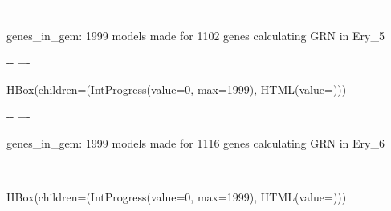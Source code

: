 \documentclass[letterpaper,10pt,english]{sphinxmanual}
\newlength\nbsphinxcodecellspacing
\begin{document}
%
{
\kern-\sphinxverbatimsmallskipamount\kern-\baselineskip
\kern+\FrameHeightAdjust\kern-\fboxrule
\vspace{\nbsphinxcodecellspacing}
%
\begin{sphinxVerbatim}[commandchars=\\\{\}]

genes\_in\_gem: 1999
models made for 1102 genes
calculating GRN in Ery\_5
\end{sphinxVerbatim}
}
\relax

{

\kern-\sphinxverbatimsmallskipamount\kern-\baselineskip
\kern+\FrameHeightAdjust\kern-\fboxrule
\vspace{\nbsphinxcodecellspacing}

%
\begin{sphinxVerbatim}[commandchars=\\\{\}]
HBox(children=(IntProgress(value=0, max=1999), HTML(value=\PYGZsq{}\PYGZsq{})))
\end{sphinxVerbatim}
}



%
{
\kern-\sphinxverbatimsmallskipamount\kern-\baselineskip
\kern+\FrameHeightAdjust\kern-\fboxrule
\vspace{\nbsphinxcodecellspacing}
%
\begin{sphinxVerbatim}[commandchars=\\\{\}]

genes\_in\_gem: 1999
models made for 1116 genes
calculating GRN in Ery\_6
\end{sphinxVerbatim}
}
\relax

{

\kern-\sphinxverbatimsmallskipamount\kern-\baselineskip
\kern+\FrameHeightAdjust\kern-\fboxrule
\vspace{\nbsphinxcodecellspacing}

%
\begin{sphinxVerbatim}[commandchars=\\\{\}]
HBox(children=(IntProgress(value=0, max=1999), HTML(value=\PYGZsq{}\PYGZsq{})))
\end{sphinxVerbatim}
}
\end{document}
